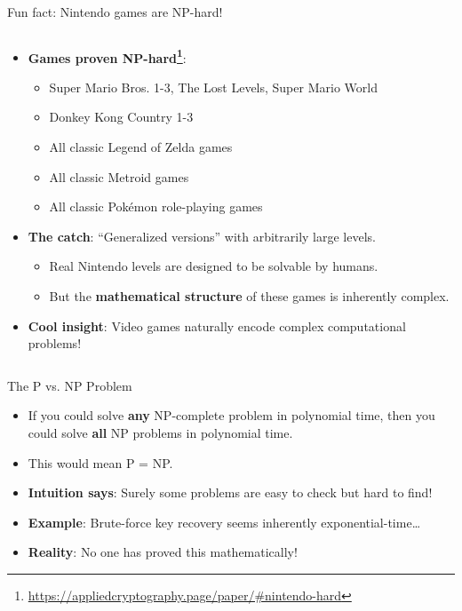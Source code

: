\documentclass[aspectratio=169, lualatex, handout]{beamer}
\begin{document}
\begin{frame}{Fun fact: Nintendo games are NP-hard!}
	\begin{columns}[c]
		\begin{column}{1\textwidth}
			\begin{itemize}[<+->]
				\item \textbf{Games proven NP-hard\footnote{\url{https://appliedcryptography.page/paper/\#nintendo-hard}}}:
				      \begin{itemize}
					      \item Super Mario Bros. 1-3, The Lost Levels, Super Mario World
					      \item Donkey Kong Country 1-3
					      \item All classic Legend of Zelda games
					      \item All classic Metroid games
					      \item All classic Pokémon role-playing games
				      \end{itemize}
				\item \textbf{The catch}: ``Generalized versions'' with arbitrarily large levels.
				      \begin{itemize}
					      \item Real Nintendo levels are designed to be solvable by humans.
					      \item But the \textbf{mathematical structure} of these games is inherently complex.
				      \end{itemize}
				\item \textbf{Cool insight}: Video games naturally encode complex computational problems!
			\end{itemize}
		\end{column}
	\end{columns}
\end{frame}

\begin{frame}{The P vs. NP Problem}
	\begin{itemize}[<+->]
		\item If you could solve \textbf{any} NP-complete problem in polynomial time, then you could solve \textbf{all} NP problems in polynomial time.
		\item This would mean P = NP.
		\item \textbf{Intuition says}: Surely some problems are easy to check but hard to find!
		\item \textbf{Example}: Brute-force key recovery seems inherently exponential-time\ldots
		\item \textbf{Reality}: No one has proved this mathematically!
	\end{itemize}
\end{frame}
\end{document}
